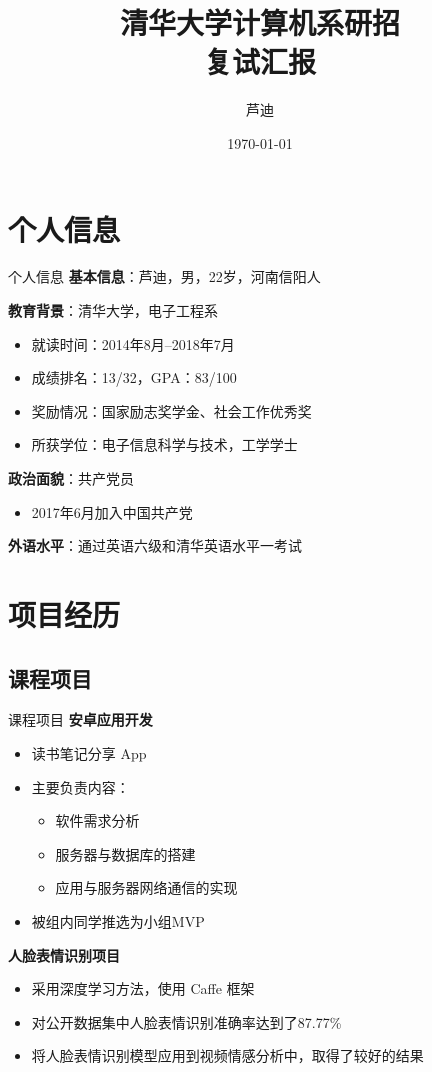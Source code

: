 \documentclass{beamer}
\title[复试汇报] %
{清华大学计算机系研招 \\
复试汇报}
\author[芦迪] %
{芦迪}
\date[2019.3.16] %
{\today}
\begin{document}
\frame{\titlepage}


\section{个人信息}
\begin{frame}{个人信息}
  \textbf{基本信息}：芦迪，男，22岁，河南信阳人

  \textbf{教育背景}：清华大学，电子工程系
  \begin{itemize}
    \item 就读时间：2014年8月--2018年7月
    \item 成绩排名：13/32，GPA：83/100
    \item 奖励情况：国家励志奖学金、社会工作优秀奖
    \item 所获学位：电子信息科学与技术，工学学士
  \end{itemize}
  \textbf{政治面貌}：共产党员
  \begin{itemize}
    \item 2017年6月加入中国共产党
  \end{itemize}
  \textbf{外语水平}：通过英语六级和清华英语水平一考试
\end{frame}

\section{项目经历}

\subsection{课程项目}
\begin{frame}{课程项目}
\textbf{安卓应用开发}
\begin{itemize}
  \item 读书笔记分享 App
  \item 主要负责内容：
  \begin{itemize}
    \item 软件需求分析
    \item 服务器与数据库的搭建
    \item 应用与服务器网络通信的实现
  \end{itemize}
  \item 被组内同学推选为小组MVP
\end{itemize}

\textbf{人脸表情识别项目}
\begin{itemize}
  \item 采用深度学习方法，使用 Caffe 框架
  \item 对公开数据集中人脸表情识别准确率达到了87.77\%
  \item 将人脸表情识别模型应用到视频情感分析中，取得了较好的结果
\end{itemize}
\end{frame}
\end{document}

